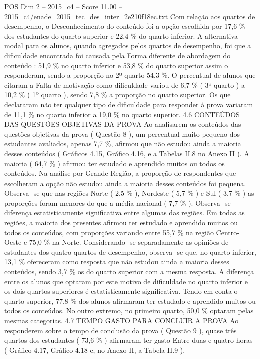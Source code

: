 \begin{textsample}{POS Dim 2 – 2015\_c4 – Score 11.00 – 2015\_c4/enade\_2015\_tec\_des\_inter\_2e210f18ec.txt}
Com relação aos quartos de desempenho, o Desconhecimento do conteúdo foi a opção escolhida por 17,6 \% dos estudantes do quarto superior e 22,4 \% do quarto inferior.
A alternativa modal para os alunos, quando agregados pelos quartos de desempenho, foi que a dificuldade encontrada foi causada pela Forma diferente de abordagem do conteúdo : 51,9 \% no quarto inferior e 53,8 \% do quarto superior assim o responderam, sendo a proporção no 2º quarto 54,3 \%.
O percentual de alunos que citaram a Falta de motivação como dificuldade variou de 6,7 \% ( 3º quarto ) a 10,2 \% ( 1º quarto ), sendo 7,8 \% a proporção no quarto superior.
Os que declararam não ter qualquer tipo de dificuldade para responder à prova variaram de 11,1 \% no quarto inferior a 19,0 \% no quarto superior. 4.6 CONTEÚDOS DAS QUESTÕES OBJETIVAS DA PROVA Ao analisarem os conteúdos das questões objetivas da prova ( Questão 8 ), um percentual muito pequeno dos estudantes avaliados, apenas 7,7 \%, afirmou que não estudou ainda a maioria desses conteúdos ( Gráficos 4.15, Gráfico 4.16, e a Tabelas II.8 no Anexo II ).
A maioria ( 64,7 \% ) afirmou ter estudado e aprendido muitos ou todos os conteúdos.
Na análise por Grande Região, a proporção de respondentes que escolheram a opção não estudou ainda a maioria desses conteúdos foi pequena.
Observa -se que nas regiões Norte ( 2,5 \% ), Nordeste ( 5,7 \% ) e Sul ( 3,7 \% ) as proporções foram menores do que a média nacional ( 7,7 \% ).
Observa -se diferença estatisticamente significativa entre algumas das regiões.
Em todas as regiões, a maioria dos presentes afirmou ter estudado e aprendido muitos ou todos os conteúdos, com proporções variando entre 55,7 \% na região Centro-Oeste e 75,0 \% na Norte.
Considerando -se separadamente as opiniões de estudantes dos quatro quartos de desempenho, observa -se que, no quarto inferior, 13,1 \% ofereceram como resposta que não estudou ainda a maioria desses conteúdos, sendo 3,7 \% os do quarto superior com a mesma resposta.
A diferença entre os alunos que optaram por este motivo de dificuldade no quarto inferior e os dois quartos superiores é estatisticamente significativa.
Tendo em conta o quarto superior, 77,8 \% dos alunos afirmaram ter estudado e aprendido muitos ou todos os conteúdos.
No outro extremo, no primeiro quarto, 50,0 \% optaram pelas mesmas categorias. 4.7 TEMPO GASTO PARA CONCLUIR A PROVA Ao responderem sobre o tempo de conclusão da prova ( Questão 9 ), quase três quartos dos estudantes ( 73,6 \% ) afirmaram ter gasto Entre duas e quatro horas ( Gráfico 4.17, Gráfico 4.18 e, no Anexo II, a Tabela II.9 ).

\end{textsample}
